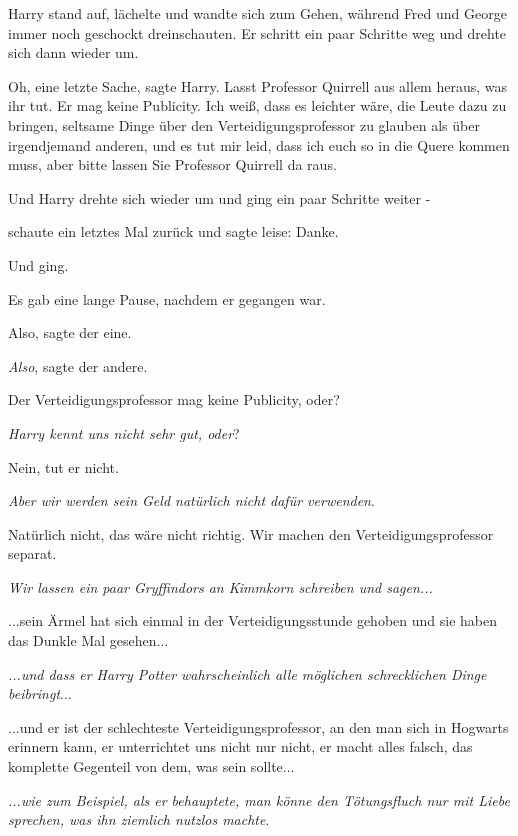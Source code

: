 Harry stand auf, lächelte und wandte sich zum Gehen, während Fred und George
immer noch geschockt dreinschauten. Er schritt ein paar Schritte weg und drehte
sich dann wieder um.

\glqq{}Oh, eine letzte Sache\grqq{}, sagte Harry. \glqq{}Lasst Professor
Quirrell aus allem heraus, was ihr tut. Er mag keine Publicity. Ich weiß, dass
es leichter wäre, die Leute dazu zu bringen, seltsame Dinge über den
Verteidigungsprofessor zu glauben als über irgendjemand anderen, und es tut mir
leid, dass ich euch so in die Quere kommen muss, aber bitte lassen Sie Professor
Quirrell da raus.\grqq{}

Und Harry drehte sich wieder um und ging ein paar Schritte weiter -

schaute ein letztes Mal zurück und sagte leise: \glqq{}Danke.\grqq{}

Und ging.

Es gab eine lange Pause, nachdem er gegangen war.

\glqq{}Also\grqq{}, sagte der eine.

\glqq{}\emph{Also}\grqq{}, sagte der andere.

\glqq{}Der Verteidigungsprofessor mag keine Publicity, oder?\grqq{}

\glqq{}\emph{Harry kennt uns nicht sehr gut, oder}?\grqq{}

\glqq{}Nein, tut er nicht.\grqq{}

\glqq{} \emph{Aber wir werden sein Geld natürlich nicht dafür verwenden}.\grqq{}

\glqq{} Natürlich nicht, das wäre nicht richtig. Wir machen den
Verteidigungsprofessor separat.\grqq{}

\glqq{}\emph{Wir lassen ein paar Gryffindors an Kimmkorn schreiben und
sagen...}\grqq{}

\glqq{}...sein Ärmel hat sich einmal in der Verteidigungsstunde gehoben und sie
haben das Dunkle Mal gesehen...\grqq{}

\glqq{}\emph{...und dass er Harry Potter wahrscheinlich alle möglichen
schrecklichen Dinge} \emph{beibringt}...\grqq{}

\glqq{}...und er ist der schlechteste Verteidigungsprofessor, an den man sich in
Hogwarts erinnern kann, er unterrichtet uns nicht nur nicht, er macht alles
falsch, das komplette Gegenteil von dem, was sein sollte...\grqq{}

\glqq{}\emph{...wie zum Beispiel, als er behauptete, man könne den Tötungsfluch
nur mit Liebe sprechen, was ihn ziemlich nutzlos machte}.\grqq{}

